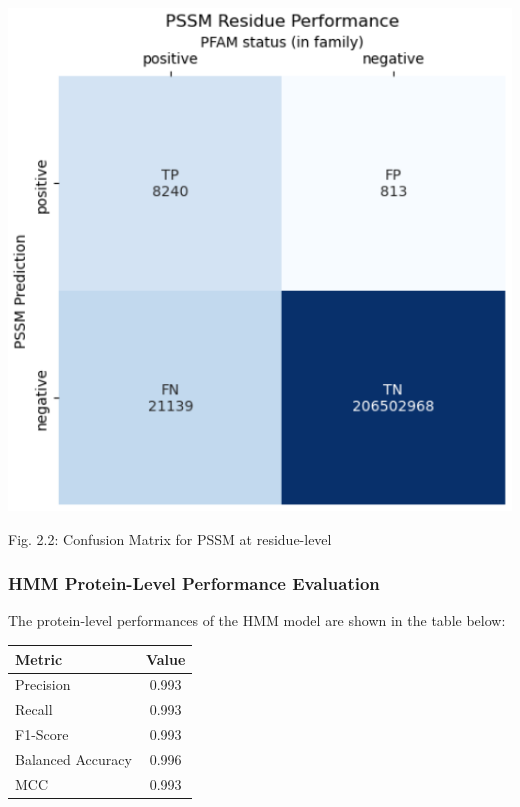 \documentclass[10pt,twocolumn,letterpaper]{article}
\begin{document}
\begin{center}
    \includegraphics[scale=0.45]{report/img/pssm_res_performance.png}
\end{center}

\begin{center}
    \small{Fig. 2.2: Confusion Matrix for PSSM at residue-level}
\end{center}

\subsubsection{HMM Protein-Level Performance Evaluation}


The protein-level performances of the HMM model are shown in the table below:

\begin{center}
    \begin{tabular}{lc}
        \toprule
        Metric & Value \\
        \midrule
        Precision & 0.993 \\
        Recall & 0.993 \\
        F1-Score & 0.993 \\
        Balanced Accuracy & 0.996 \\
        MCC & 0.993 \\
        \bottomrule
    \end{tabular}
\end{center} \\
\end{document}
